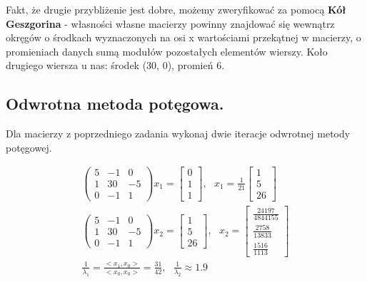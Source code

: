 \documentclass[main.tex]{subfiles}
\begin{document}
    Fakt, że drugie przybliżenie jest dobre, możemy zweryfikować za pomocą \textbf{Kół Geszgorina} - własności własne
    macierzy powinny znajdować się wewnątrz okręgów o środkach wyznaczonych na osi x wartościami przekątnej w macierzy,
    o promieniach danych sumą modułów pozostałych elementów wierszy. Koło drugiego wiersza u nas: środek (30, 0),
    promień 6.\\

    \subsection{Odwrotna metoda potęgowa.}

    \begin{exercise}
        Dla macierzy z poprzedniego zadania wykonaj dwie iteracje odwrotnej metody potęgowej.
    \end{exercise}

    \begin{gather*}
        \begin{pmatrix}
            5 & -1 & 0\\
            1 & 30 & -5\\
            0 & -1 & 1
        \end{pmatrix}
        x_1 =
        \begin{bmatrix}
            0 \\
            1 \\
            1
        \end{bmatrix}, ~~~
        x_1 = \frac{1}{21}
        \begin{bmatrix}
            1 \\
            5 \\
            26
        \end{bmatrix}\\
        \begin{pmatrix}
            5 & -1 & 0\\
            1 & 30 & -5\\
            0 & -1 & 1
        \end{pmatrix}
        x_2 =
        \begin{bmatrix}
            1 \\
            5 \\
            26
        \end{bmatrix}, ~~~
        x_2 =
        \begin{bmatrix}
            \frac{24197}{4844155} \\
            \frac{2758}{13833} \\
            \frac{1516}{1113}
        \end{bmatrix}\\
        \frac{1}{\lambda_1} = \frac{<x_1, x_0>}{<x_0, x_0>} = \frac{31}{42}, ~~~
        \frac{1}{\lambda_2} \approx 1.9
    \end{gather*}
\end{document}
